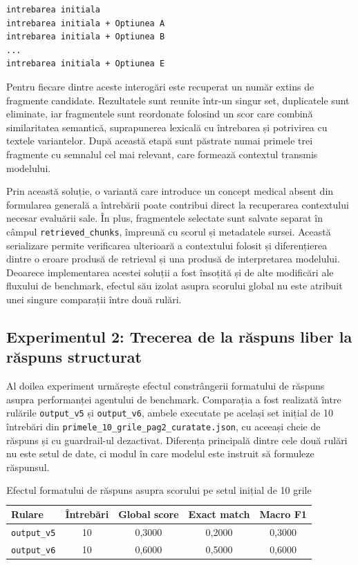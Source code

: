 \documentclass[12pt, a4paper, oneside, romanian]{teza-upb}
\begin{document}
\begin{lstlisting}[basicstyle=\ttfamily\footnotesize]
intrebarea initiala
intrebarea initiala + Optiunea A
intrebarea initiala + Optiunea B
...
intrebarea initiala + Optiunea E
\end{lstlisting}

Pentru fiecare dintre aceste interogări este recuperat un număr extins de fragmente candidate. Rezultatele sunt reunite într-un singur set, duplicatele sunt eliminate, iar fragmentele sunt reordonate folosind un scor care combină similaritatea semantică, suprapunerea lexicală cu întrebarea și potrivirea cu textele variantelor. După această etapă sunt păstrate numai primele trei fragmente cu semnalul cel mai relevant, care formează contextul transmis modelului.

Prin această soluție, o variantă care introduce un concept medical absent din formularea generală a întrebării poate contribui direct la recuperarea contextului necesar evaluării sale. În plus, fragmentele selectate sunt salvate separat în câmpul \texttt{retrieved\_chunks}, împreună cu scorul și metadatele sursei. Această serializare permite verificarea ulterioară a contextului folosit și diferențierea dintre o eroare produsă de retrieval și una produsă de interpretarea modelului. Deoarece implementarea acestei soluții a fost însoțită și de alte modificări ale fluxului de benchmark, efectul său izolat asupra scorului global nu este atribuit unei singure comparații între două rulări.

\subsection{Experimentul 2: Trecerea de la răspuns liber la răspuns structurat}

Al doilea experiment urmărește efectul constrângerii formatului de răspuns asupra performanței agentului de benchmark. Comparația a fost realizată între rulările \texttt{output\_v5} și \texttt{output\_v6}, ambele executate pe același set inițial de 10 întrebări din \texttt{primele\_10\_grile\_pag2\_curatate.json}, cu aceeași cheie de răspuns și cu guardrail-ul dezactivat. Diferența principală dintre cele două rulări nu este setul de date, ci modul în care modelul este instruit să formuleze răspunsul.

\begin{table}[H]
\centering
\caption{Efectul formatului de răspuns asupra scorului pe setul inițial de 10 grile}
\label{tab:experiment_format_v5_v6}
\small
\begin{tabular}{lcccc}
\toprule
\textbf{Rulare} & \textbf{Întrebări} & \textbf{Global score} & \textbf{Exact match} & \textbf{Macro F1} \\
\midrule
\texttt{output\_v5} & 10 & 0,3000 & 0,2000 & 0,3000 \\
\texttt{output\_v6} & 10 & 0,6000 & 0,5000 & 0,6000 \\
\bottomrule
\end{tabular}
\end{table}
\end{document}
